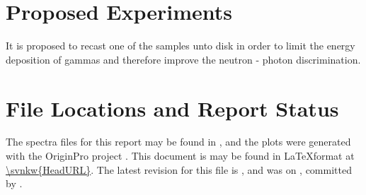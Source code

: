 \documentclass[draftcls,onecolumn]{IEEEtran}
\begin{document}
\section{Proposed Experiments}
It is proposed to recast one of the samples unto disk in order to limit the energy deposition of gammas and therefore improve the neutron - photon discrimination.
\pagebreak
\appendices
\section{}
\section{File Locations and Report Status}
The spectra files for this report may be found in , and the plots were generated with the OriginPro project .
This document is may be found in \LaTeX format at \url{\svnkw{HeadURL}}.  
The latest revision for this file is \svnrev, and was on \svndate, committed by \svnauthor.
\end{document}
